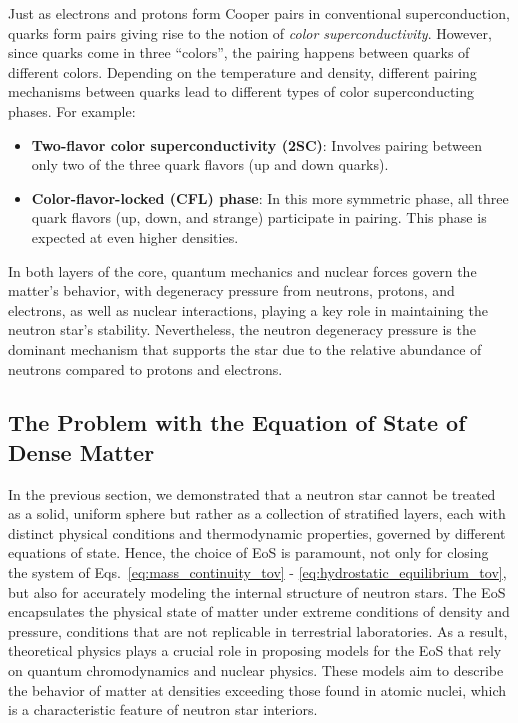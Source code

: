 \documentclass[main.tex]{subfiles}
\begin{document}
    Just as electrons and protons form Cooper pairs in conventional superconduction, quarks form pairs giving rise to the notion of \textit{color superconductivity}. However, since quarks come in three ``colors'', the pairing happens between quarks of different colors. Depending on the temperature and density, different pairing mechanisms between quarks lead to different types of color superconducting phases. For example:
    \begin{itemize}
        \item \textbf{Two-flavor color superconductivity (2SC)}: Involves pairing between only two of the three quark flavors (up and down quarks).
        \item \textbf{Color-flavor-locked (CFL) phase}: In this more symmetric phase, all three quark flavors (up, down, and strange) participate in pairing. This phase is expected at even higher densities.
    \end{itemize}

    In both layers of the core, quantum mechanics and nuclear forces govern the matter's behavior, with degeneracy pressure from neutrons, protons, and electrons, as well as nuclear interactions, playing a key role in maintaining the neutron star’s stability. Nevertheless, the neutron degeneracy pressure is the dominant mechanism that supports the star due to the relative abundance of neutrons compared to protons and electrons.


    
    \subsection{The Problem with the Equation of State of Dense Matter}
    In the previous section, we demonstrated that a neutron star cannot be treated as a solid, uniform sphere but rather as a collection of stratified layers, each with distinct physical conditions and thermodynamic properties, governed by different equations of state. Hence, the choice of EoS is paramount, not only for closing the system of Eqs.~\eqref{eq:mass_continuity_tov} - \eqref{eq:hydrostatic_equilibrium_tov}, but also for accurately modeling the internal structure of neutron stars. The EoS encapsulates the physical state of matter under extreme conditions of density and pressure, conditions that are not replicable in terrestrial laboratories. As a result, theoretical physics plays a crucial role in proposing models for the EoS that rely on quantum chromodynamics and nuclear physics. These models aim to describe the behavior of matter at densities exceeding those found in atomic nuclei, which is a characteristic feature of neutron star interiors.
    
\end{document}
